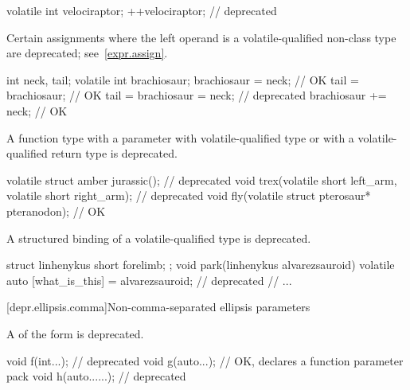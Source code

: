 \begin{example}
\begin{codeblock}
volatile int velociraptor;
++velociraptor;                     // deprecated
\end{codeblock}
\end{example}


\pnum
Certain assignments
where the left operand is a volatile-qualified non-class type
are deprecated; see~\ref{expr.assign}.

\begin{example}
\begin{codeblock}
int neck, tail;
volatile int brachiosaur;
brachiosaur = neck;                 // OK
tail = brachiosaur;                 // OK
tail = brachiosaur = neck;          // deprecated
brachiosaur += neck;                // OK
\end{codeblock}
\end{example}


\pnum
A function type
with a parameter with volatile-qualified type or
with a volatile-qualified return type is deprecated.

\begin{example}
\begin{codeblock}
volatile struct amber jurassic();                               // deprecated
void trex(volatile short left_arm, volatile short right_arm);   // deprecated
void fly(volatile struct pterosaur* pteranodon);                // OK
\end{codeblock}
\end{example}


\pnum
A structured binding of a volatile-qualified type
is deprecated.

\begin{example}
\begin{codeblock}
struct linhenykus { short forelimb; };
void park(linhenykus alvarezsauroid) {
  volatile auto [what_is_this] = alvarezsauroid;                // deprecated
  // ...
}
\end{codeblock}
\end{example}

[depr.ellipsis.comma]{Non-comma-separated ellipsis parameters}

A 
of the form
 
is deprecated.
\begin{example}
\begin{codeblock}
void f(int...);         // deprecated
void g(auto...);        // OK, declares a function parameter pack
void h(auto......);     // deprecated
\end{codeblock}
\end{example}

